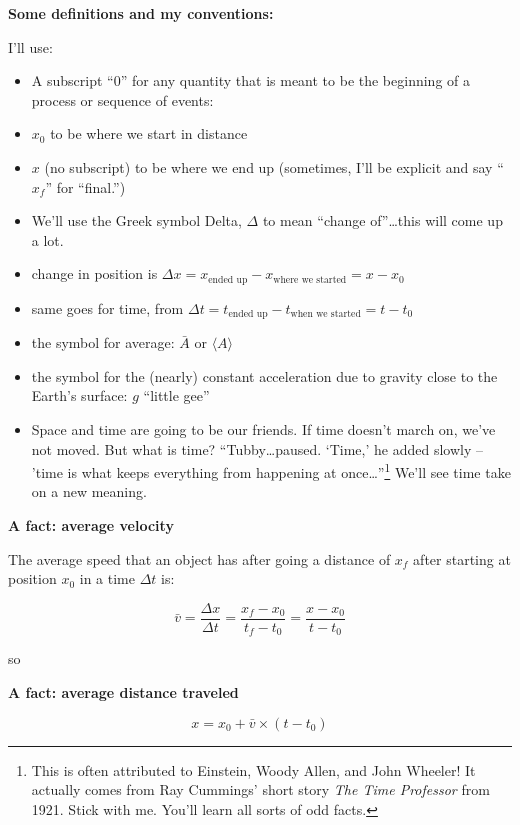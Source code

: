 \documentclass[
]{book}
\providecommand{\tightlist}{%
  \setlength{\itemsep}{0pt}\setlength{\parskip}{0pt}}
\begin{document}
\textbf{Some definitions and my conventions:}

I'll use:

\begin{itemize}
\tightlist
\item
  A subscript ``0'' for any quantity that is meant to be the beginning of a process or sequence of events:
\item
  \(x_0\) to be where we start in distance
\item
  \(x\) (no subscript) to be where we end up (sometimes, I'll be explicit and say ``\(x_f\)'' for ``final.'')
\item
  We'll use the Greek symbol Delta, \(\Delta\) to mean ``change of''\ldots this will come up a lot.
\item
  change in position is \(\Delta x = x_{\text{ended up}}-x_{\text{where we started}} = x-x_0\)
\item
  same goes for time, from \(\Delta t= t_{\text{ended up}}-t_{\text{when we started}} = t - t_0\)
\item
  the symbol for average: \(\bar{A}\) or \(\langle
  A\rangle\)
\item
  the symbol for the (nearly) constant acceleration due to gravity close to the Earth's surface: \(g\) ``little gee''
\item
  Space and time are going to be our friends. If time doesn't march on, we've not moved. But what is time? ``Tubby\ldots paused. `Time,' he added slowly -- 'time is what keeps everything from happening at once\ldots''\footnote{This is often attributed to Einstein, Woody Allen, and John Wheeler! It actually comes from Ray Cummings' short story \emph{The Time Professor} from 1921. Stick with me. You'll learn all sorts of odd facts.} We'll see time take on a new meaning.
\end{itemize}

\textbf{A fact: average velocity}

The average speed that an object has after going a distance of \(x_f\) after starting at position \(x_0\) in a time \(\Delta t\) is:

\begin{equation}
\bar{v} = \frac{\Delta x}{\Delta t} = \frac{x_f-x_0}{t_f - t_0}=\frac{x-x_0}{t - t_0} 
\end{equation}

so

\textbf{A fact: average distance traveled}

\[x =x_0 +\bar{v}\times(t-t_0)\]
\end{document}
